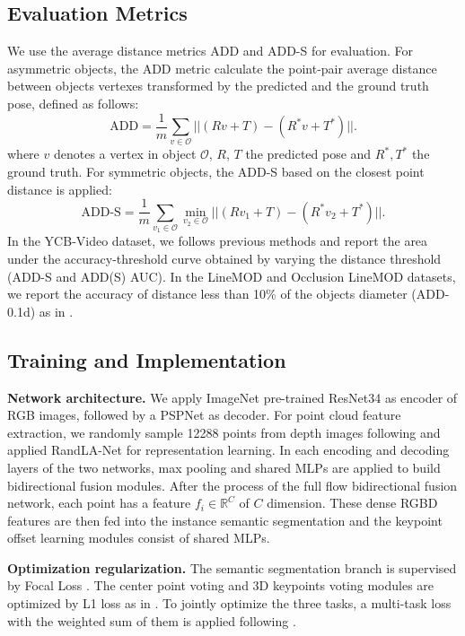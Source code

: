 \subsection{Evaluation Metrics}
We use the average distance metrics ADD and ADD-S for evaluation. For asymmetric objects, the ADD metric calculate the point-pair average distance between objects vertexes transformed by the predicted and the ground truth pose, defined as follows:
\begin{equation}
    \label{eqn:ADD}
    \textrm{ADD} = \frac{1}{m} \sum_{v \in \mathcal{O}} || (Rv+T) - (R^*v + T^*) || .
\end{equation}
where $v$ denotes a vertex in object $\mathcal{O}$, $R$, $T$ the predicted pose and $R^*, T^*$ the ground truth.
For symmetric objects, the ADD-S based on the closest point distance is applied:
\begin{equation}
    \label{eqn:ADDS}
    \textrm{ADD{-}S} = \frac{1}{m} \sum_{v_1 \in \mathcal{O}} \min_{v_2 \in \mathcal{O}}{|| (Rv_1+T) - (R^*v_2 + T^*) ||} .
\end{equation}
In the YCB-Video dataset, we follows previous methods \cite{xiang2017posecnn,wang2019densefusion,he2020pvn3d} and report the area under the accuracy-threshold curve obtained by varying the distance threshold (ADD-S and ADD(S) AUC). In the LineMOD and Occlusion LineMOD datasets, we report the accuracy of distance less than 10\% of the objects diameter (ADD-0.1d) as in \cite{hinterstoisser2012model,peng2019pvnet}.

\subsection{Training and Implementation}
\textbf{Network architecture.} We apply ImageNet \cite{deng2009imagenet} pre-trained ResNet34 \cite{resnet} as encoder of RGB images, followed by a PSPNet \cite{zhao2017pyramid} as decoder.  For point cloud feature extraction, we randomly sample 12288 points from depth images following \cite{he2020pvn3d} and applied RandLA-Net \cite{hu2020randla} for representation learning. In each encoding and decoding layers of the two networks, max pooling and shared MLPs are applied to build bidirectional fusion modules. After the process of the full flow bidirectional fusion network, each point has a feature $f_i \in \mathbb{R}^C$ of $C$ dimension. These dense RGBD features are then fed into the instance semantic segmentation and the keypoint offset learning modules consist of shared MLPs.

\textbf{Optimization regularization.} The semantic segmentation branch is supervised by Focal Loss \cite{lin2017focal}. The center point voting and 3D keypoints voting modules are optimized by L1 loss as in \cite{he2020pvn3d}. To jointly optimize the three tasks, a multi-task loss with the weighted sum of them is applied following \cite{he2020pvn3d}.

